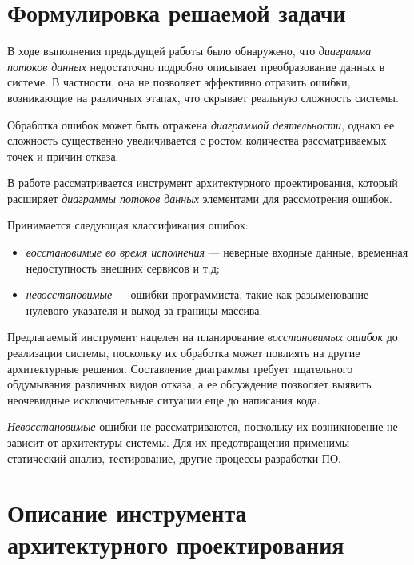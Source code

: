 \documentclass[listings]{labreport}
\begin{document}
\maketitlepage

\section*{Формулировка решаемой задачи}

В ходе выполнения предыдущей работы было обнаружено, что \textit{диаграмма потоков данных}
недостаточно подробно описывает преобразование данных в системе. В частности, она
не позволяет эффективно отразить ошибки, возникающие на различных этапах, что
скрывает реальную сложность системы.

Обработка ошибок может быть отражена \textit{диаграммой деятельности}, однако ее сложность
существенно увеличивается с ростом количества рассматриваемых точек и причин отказа. 

В работе рассматривается инструмент архитектурного проектирования, который
расширяет \textit{диаграммы потоков данных} элементами для рассмотрения ошибок.

Принимается следующая классификация ошибок:
\begin{itemize}[noitemsep,topsep=0em]
\item \textit{восстановимые во время исполнения} — неверные входные данные,
  временная недоступность внешних сервисов и т.д;
\item \textit{невосстановимые} — ошибки программиста, такие как разыменование нулевого указателя и
  выход за границы массива.
\end{itemize}

Предлагаемый инструмент нацелен на планирование \textit{восстановимых ошибок} до реализации системы,
поскольку их обработка может повлиять на другие архитектурные решения. Составление диаграммы требует
тщательного обдумывания различных видов отказа, а ее обсуждение позволяет выявить неочевидные
исключительные ситуации еще до написания кода.

\textit{Невосстановимые} ошибки не рассматриваются, поскольку их возникновение не зависит от архитектуры
системы. Для их предотвращения применимы статический анализ, тестирование, другие процессы разработки ПО.

\section*{Описание инструмента архитектурного проектирования}
\end{document}
